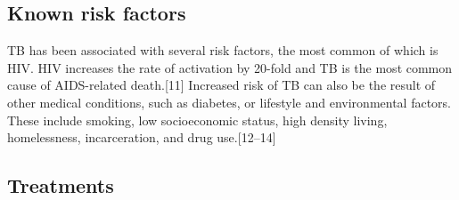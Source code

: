 \documentclass[11pt,twoside]{bristolthesis}
\begin{document}
  \hypertarget{known-risk-factors}{%
  \subsection{Known risk factors}\label{known-risk-factors}}
  
  TB has been associated with several risk factors, the most common of which is HIV. HIV increases the rate of activation by 20-fold and TB is the most common cause of AIDS-related death.{[}11{]} Increased risk of TB can also be the result of other medical conditions, such as diabetes, or lifestyle and environmental factors. These include smoking, low socioeconomic status, high density living, homelessness, incarceration, and drug use.{[}12--14{]}
  
  \hypertarget{treatments}{%
  \subsection{Treatments}\label{treatments}}
  
\end{document}
